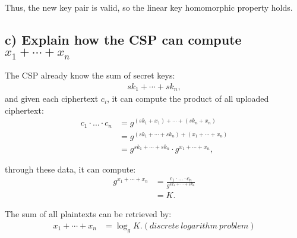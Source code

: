 Thus, the new key pair is valid, so the linear key homomorphic property holds.

\subsection*{c) Explain how the CSP can compute \(x_1+\cdots+x_n\)}
%
The CSP already know the sum of secret keys:
\begin{align*}
    sk_1+\cdots+sk_n,
\end{align*}
and given each ciphertext \(c_i\), it can compute the product of all uploaded ciphertext:
\begin{align*}
    c_1\cdot...\cdot c_n &= g^{(sk_1+x_1)+\cdots +(sk_n+x_n)}\\
    &= g^{(sk_1+\cdots +sk_n)+(x_1+\cdots +x_n)}\\
    &= g^{sk_1+\cdots +sk_n}\cdot g^{x_1+\cdots +x_n},    
\end{align*}

through these data, it can compute:
\begin{align*}
    g^{x_1+\cdots +x_n} &= \frac{c_1\cdot...\cdot c_n}{g^{sk_1+\cdots +sk_n}}\\
    &= K.
\end{align*}

The sum of all plaintexts can be retrieved by:
\begin{align*}
    x_1+\cdots+x_n &= \log_{g}K. (discrete\ logarithm\ problem)
\end{align*}